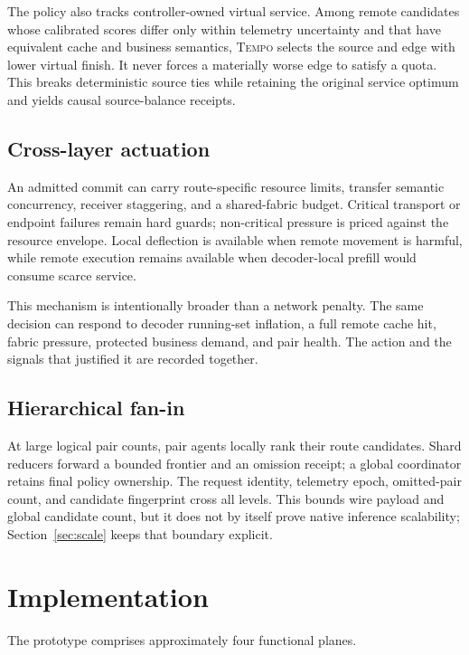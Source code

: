 \documentclass[10pt,twocolumn]{article}
\newcommand{\system}{\textsc{Tempo}\xspace}
\begin{document}
The policy also tracks controller-owned virtual service.  Among remote
candidates whose calibrated scores differ only within telemetry uncertainty
and that have equivalent cache and business semantics, \system selects the
source and edge with lower virtual finish.  It never forces a materially worse
edge to satisfy a quota.  This breaks deterministic source ties while retaining
the original service optimum and yields causal source-balance receipts.

\subsection{Cross-layer actuation}

An admitted commit can carry route-specific resource limits, transfer semantic
concurrency, receiver staggering, and a shared-fabric budget.  Critical
transport or endpoint failures remain hard guards; non-critical pressure is
priced against the resource envelope.  Local deflection is available when
remote movement is harmful, while remote execution remains available when
decoder-local prefill would consume scarce service.

This mechanism is intentionally broader than a network penalty.  The same
decision can respond to decoder running-set inflation, a full remote cache hit,
fabric pressure, protected business demand, and pair health.  The action and
the signals that justified it are recorded together.

\subsection{Hierarchical fan-in}

At large logical pair counts, pair agents locally rank their route candidates.
Shard reducers forward a bounded frontier and an omission receipt; a global
coordinator retains final policy ownership.  The request identity, telemetry
epoch, omitted-pair count, and candidate fingerprint cross all levels.  This
bounds wire payload and global candidate count, but it does not by itself prove
native inference scalability; Section~\ref{sec:scale} keeps that boundary
explicit.

\section{Implementation}

The prototype comprises approximately four functional planes.
\end{document}
